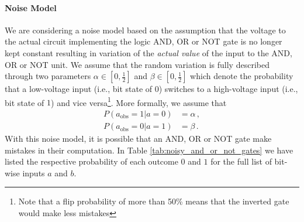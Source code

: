 \paragraph{Noise Model} We are considering a noise model based on the assumption that the voltage to the actual circuit implementing the logic AND, OR or NOT gate is no longer kept constant resulting in variation of the {\em actual value} of the input to the AND, OR or NOT unit. We assume that the random variation is fully described through two parameters $\alpha \in \left[0,\frac{1}{2}\right]$ and $\beta \in \left[0,\frac{1}{2}\right]$ which denote the probability that a low-voltage input (i.e., bit state of $0$) switches to a high-voltage input (i.e., bit state of $1$) and vice versa\footnote{Note that a flip probability of more than 50\% means that the inverted gate would make less mistakes}. More formally, we assume that
\begin{align}
    P(a_\text{obs} = 1 | a = 0) & = \alpha\,, \label{eq:bit_flip_to_1} \\
    P(a_\text{obs} = 0 | a = 1) & = \beta\,. \label{eq:bit_flip_to_0}
\end{align}
With this noise model, it is possible that an AND, OR or NOT gate make mistakes in their computation. In Table \ref{tab:noisy_and_or_not_gates} we have listed the respective probability of each outcome $0$ and $1$ for the full list of bit-wise inputs $a$ and $b$. 


